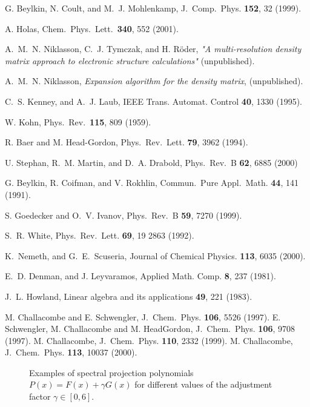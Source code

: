 \commentoutA{\documentclass[superbib,aps,prb,epsfig,floats,twocolumn]{revtex4}}
\begin{document}
\begin{references}
 G. Beylkin, N. Coult, and M.\ J. Mohlenkamp,
J.\ Comp.\ Phys. {\bf 152}, 32 (1999).

 A. Holas, Chem.\ Phys.\ Lett.\ {\bf 340}, 552 (2001).

 A.\ M.\ N. Niklasson, C.\ J. Tymczak, and H. R\"oder,
{\it "A multi-resolution density matrix approach to electronic structure
calculations"} (unpublished).

 A.\ M.\ N. Niklasson, {\it Expansion
algorithm for the density matrix}, (unpublished).

 C.\ S. Kenney, and A.\ J. Laub,
IEEE Trans. Automat. Control {\bf 40}, 1330 (1995).

 W. Kohn,
Phys.\ Rev.\ {\bf 115}, 809 (1959).

 R. Baer and M. Head-Gordon,
Phys.\ Rev.\ Lett. {\bf 79}, 3962 (1994).

 U. Stephan, R.\ M. Martin, and D.\ A. Drabold,
Phys.\ Rev.\ B {\bf 62}, 6885 (2000)

 G. Beylkin, R. Coifman, and V. Rokhlin,
Commun.\ Pure Appl.\ Math. {\bf 44}, 141 (1991).

 S. Goedecker and O.\ V. Ivanov,
Phys.\ Rev.\ B {\bf 59}, 7270 (1999).

 S.\ R. White,
Phys.\ Rev.\ Lett. {\bf 69}, 19 2863 (1992).

 K.\ Nemeth, and G.\ E.\ Scuseria,
Journal of Chemical Physics. {\bf 113}, 6035 (2000).

 E.\ D. Denman, and J. Leyvaramos,
Applied Math. Comp. {\bf 8}, 237 (1981).

 J.\ L. Howland,
Linear algebra and its applications {\bf 49}, 221 (1983).~

 M. Challacombe and E. Schwengler,
J.\ Chem.\ Phys. {\bf 106}, 5526 (1997).
E. Schwengler, M. Challacombe and M. HeadGordon,
J.\ Chem.\ Phys. {\bf 106}, 9708 (1997).
M. Challacombe, J.\ Chem.\ Phys. {\bf 110}, 2332 (1999).
M.  Challacombe, J.\ Chem.\ Phys. {\bf 113}, 10037 (2000).


\end{references}

\begin{figure}
\caption{\small
\label{Conv}}
\end{figure}

\begin{figure}
\caption{\small 
Examples of spectral projection polynomials $P(x) = F(x) + \gamma G(x)$
for different values of the adjustment factor $\gamma \in [0,6]$.
\label{Fig_F_G}}
\end{figure}

\begin{figure}
\caption{\small
\label{ConvN}}
\end{figure}

\begin{figure}
\caption{\small
\label{Lin}}
\end{figure}
\end{document}
